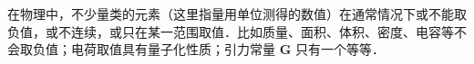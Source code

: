 在物理中，不少量类的元素（这里指量用单位测得的数值）在通常情况下或不能取负值，或不连续，或只在某一范围取值．比如质量、面积、体积、密度、电容等不会取负值；电荷取值具有量子化性质；引力常量 $\boldsymbol{G}$ 只有一个等等．